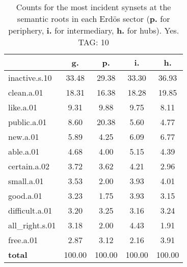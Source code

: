 \begin{table}[h!]
\begin{center}
\begin{tabular}{| l | c | c | c | c |}\hline
 & g. & p. & i. & h. \\\hline
inactive.s.10 & 33.48  & 29.38  & 33.30  & 36.93 \\\hline
clean.a.01 & 18.31  & 16.38  & 18.28  & 19.85 \\\hline
like.a.01 & 9.31  & 9.88  & 9.75  & 8.11 \\\hline
public.a.01 & 8.60  & 20.38  & 5.60  & 4.77 \\\hline
new.a.01 & 5.89  & 4.25  & 6.09  & 6.77 \\\hline
able.a.01 & 4.68  & 4.00  & 5.15  & 4.39 \\\hline
certain.a.02 & 3.72  & 3.62  & 4.21  & 2.96 \\\hline
small.a.01 & 3.53  & 2.00  & 3.93  & 4.01 \\\hline
good.a.01 & 3.23  & 1.75  & 3.93  & 3.15 \\\hline
difficult.a.01 & 3.20  & 3.25  & 3.16  & 3.24 \\\hline
all\_right.s.01 & 3.18  & 2.00  & 4.43  & 1.91 \\\hline
free.a.01 & 2.87  & 3.12  & 2.16  & 3.91 \\\hline
{{\bf total}} & 100.00  & 100.00  & 100.00  & 100.00 \\\hline
\end{tabular}
\caption{Counts for the most incident synsets at the semantic roots in each Erd\"os sector ({\bf p.} for periphery, {\bf i.} for intermediary, {\bf h.} for hubs). Yes. TAG: 10}
\end{center}
\end{table}
